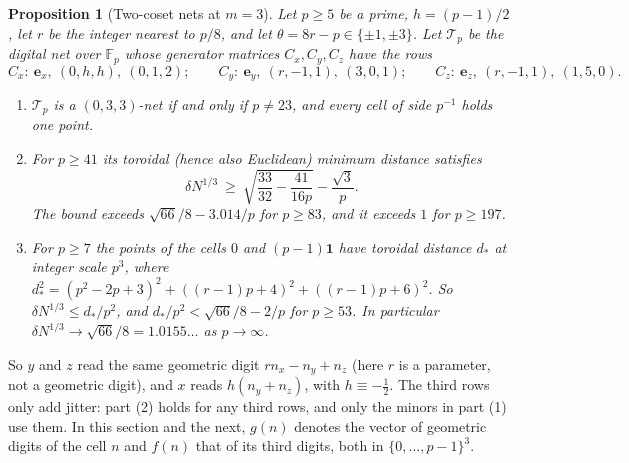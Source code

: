 \documentclass[11pt]{amsart}
\newtheorem{proposition}[theorem]{Proposition}
\theoremstyle{definition}
\theoremstyle{plain}
\newcommand{\F}{\mathbb{F}}
\newcommand{\e}{\mathbf{e}}
\begin{document}
\begin{proposition}[Two-coset nets at $m=3$]\label{prop:twocoset}
Let $p\ge5$ be a prime, $h=(p-1)/2$, let $r$ be the integer nearest to $p/8$, and let $\theta=8r-p\in\{\pm1,\pm3\}$. Let $\mathcal T_p$ be the digital net over $\F_p$ whose generator matrices $C_x,C_y,C_z$ have the rows
\[
C_x:\ \e_x,\ (0,h,h),\ (0,1,2);\qquad C_y:\ \e_y,\ (r,-1,1),\ (3,0,1);\qquad C_z:\ \e_z,\ (r,-1,1),\ (1,5,0).
\]
\begin{enumerate}
\item $\mathcal T_p$ is a $(0,3,3)$-net if and only if $p\ne23$, and every cell of side $p^{-1}$ holds one point.
\item For $p\ge41$ its toroidal (hence also Euclidean) minimum distance satisfies
\[
\delta N^{1/3}\ \ge\ \sqrt{\frac{33}{32}-\frac{41}{16p}}-\frac{\sqrt3}p.
\]
The bound exceeds $\sqrt{66}/8-3.014/p$ for $p\ge83$, and it exceeds $1$ for $p\ge197$.
\item For $p\ge7$ the points of the cells $0$ and $(p-1)\mathbf 1$ have toroidal distance $d_*$ at integer scale $p^3$, where $d_*^2=(p^2-2p+3)^2+((r-1)p+4)^2+((r-1)p+6)^2$. So $\delta N^{1/3}\le d_*/p^2$, and $d_*/p^2<\sqrt{66}/8-2/p$ for $p\ge53$. In particular $\delta N^{1/3}\to\sqrt{66}/8=1.0155\ldots$ as $p\to\infty$.
\end{enumerate}
\end{proposition}

So $y$ and $z$ read the same geometric digit $rn_x-n_y+n_z$ (here $r$ is a parameter, not a geometric digit), and $x$ reads $h(n_y+n_z)$, with $h\equiv-\frac12$. The third rows only add jitter: part (2) holds for any third rows, and only the minors in part (1) use them. In this section and the next, $g(n)$ denotes the vector of geometric digits of the cell $n$ and $f(n)$ that of its third digits, both in $\{0,\dots,p-1\}^3$.
\end{document}
